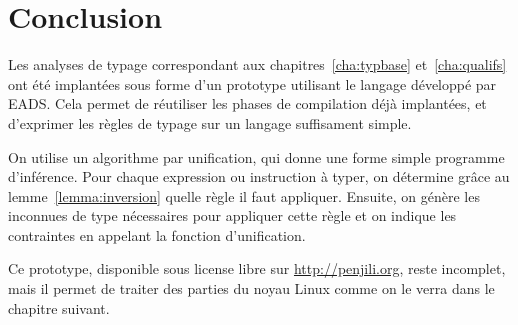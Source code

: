 \section*{Conclusion}

Les analyses de typage correspondant aux chapitres~\ref{cha:typbase}
et~\ref{cha:qualifs} ont été implantées sous forme d'un prototype utilisant le
langage \newspeak développé par EADS. Cela permet de réutiliser les phases de
compilation déjà implantées, et d'exprimer les règles de typage sur un langage
suffisament simple.

On utilise un algorithme par unification, qui donne une forme simple
programme d'inférence. Pour chaque expression ou instruction à typer, on
détermine grâce au lemme~\ref{lemma:inversion} quelle règle il faut appliquer.
Ensuite, on génère les inconnues de type nécessaires pour appliquer cette règle
et on indique les contraintes en appelant la fonction d'unification.

Ce prototype, disponible sous license libre sur \url{http://penjili.org}, reste
incomplet, mais il permet de traiter des parties du noyau Linux comme on le
verra dans le chapitre suivant.

